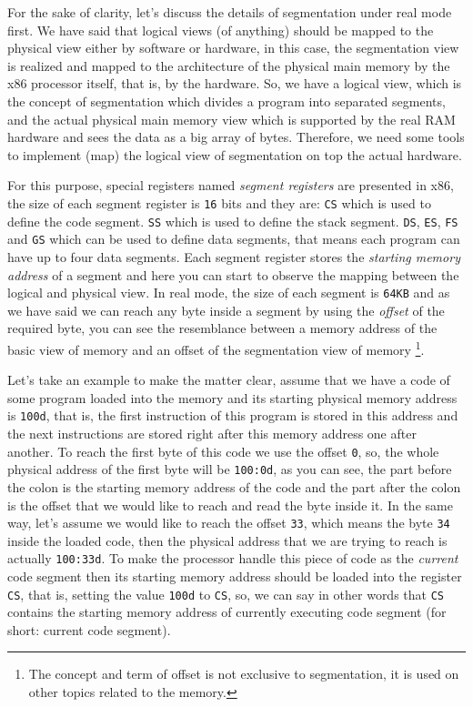 For the sake of clarity, let's discuss the details of segmentation under
real mode first. We have said that logical views (of anything) should be
mapped to the physical view either by software or hardware, in this
case, the segmentation view is realized and mapped to the architecture
of the physical main memory by the x86 processor itself, that is, by the
hardware. So, we have a logical view, which is the concept of
segmentation which divides a program into separated segments, and the
actual physical main memory view which is supported by the real RAM
hardware and sees the data as a big array of bytes. Therefore, we need
some tools to implement (map) the logical view of segmentation on top
the actual hardware.

For this purpose, special registers named \emph{segment registers} are
presented in x86, the size of each segment register is \lstinline!16!
bits and they are: \lstinline!CS! which is used to define the code
segment. \lstinline!SS! which is used to define the stack segment.
\lstinline!DS!, \lstinline!ES!, \lstinline!FS! and \lstinline!GS! which
can be used to define data segments, that means each program can have up
to four data segments. Each segment register stores the \emph{starting
memory address} of a segment and here you can start to observe the
mapping between the logical and physical view. In real mode, the size of
each segment is \lstinline!64KB! and as we have said we can reach any
byte inside a segment by using the \emph{offset} of the required byte,
you can see the resemblance between a memory address of the basic view
of memory and an offset of the segmentation view of memory \footnote{The
  concept and term of offset is not exclusive to segmentation, it is
  used on other topics related to the memory.}.

Let's take an example to make the matter clear, assume that we have a
code of some program loaded into the memory and its starting physical
memory address is \lstinline!100d!, that is, the first instruction of
this program is stored in this address and the next instructions are
stored right after this memory address one after another. To reach the
first byte of this code we use the offset \lstinline!0!, so, the whole
physical address of the first byte will be \lstinline!100:0d!, as you
can see, the part before the colon is the starting memory address of the
code and the part after the colon is the offset that we would like to
reach and read the byte inside it. In the same way, let's assume we
would like to reach the offset \lstinline!33!, which means the byte
\lstinline!34! inside the loaded code, then the physical address that we
are trying to reach is actually \lstinline!100:33d!. To make the
processor handle this piece of code as the \emph{current} code segment
then its starting memory address should be loaded into the register
\lstinline!CS!, that is, setting the value \lstinline!100d! to
\lstinline!CS!, so, we can say in other words that \lstinline!CS!
contains the starting memory address of currently executing code segment
(for short: current code segment).

